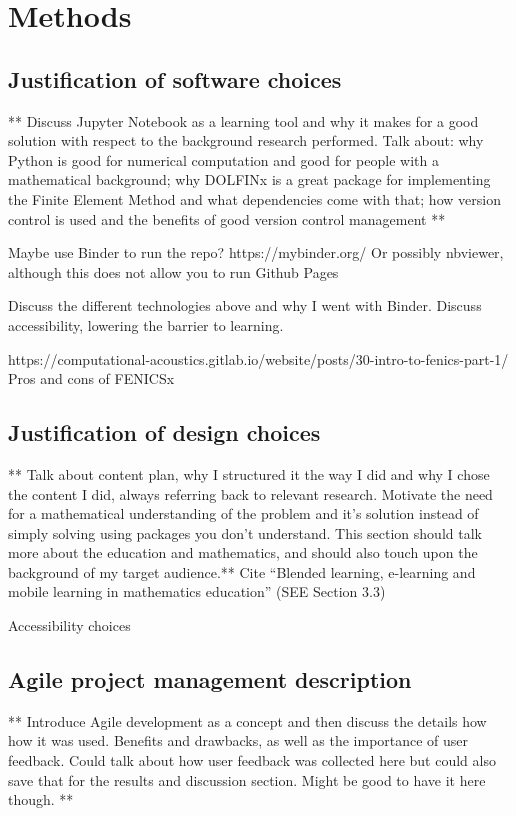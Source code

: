 \chapter{Methods}
\label{chapter2}


\section{Justification of software choices}
** Discuss Jupyter Notebook as a learning tool and why it makes for a good solution with respect to the background research performed. Talk about: why Python is good for numerical computation and good for people with a mathematical background; why DOLFINx is a great package for implementing the Finite Element Method and what dependencies come with that; how version control is used and the benefits of good version control management **

Maybe use Binder to run the repo? https://mybinder.org/
Or possibly nbviewer, although this does not allow you to run
Github Pages

Discuss the different technologies above and why I went with Binder. Discuss accessibility, lowering the barrier to learning.

https://computational-acoustics.gitlab.io/website/posts/30-intro-to-fenics-part-1/ Pros and cons of FENICSx

\section{Justification of design choices}
** Talk about content plan, why I structured it the way I did and why I chose the content I did, always referring back to relevant research. Motivate the need for a mathematical understanding of the problem and it's solution instead of simply solving using packages you don't understand. This section should talk more about the education and mathematics, and should also touch upon the background of my target audience.** Cite ``Blended learning, e-learning and mobile learning in mathematics education'' (SEE Section 3.3)

Accessibility choices

\section{Agile project management description}
** Introduce Agile development as a concept and then discuss the details how how it was used. Benefits and drawbacks, as well as the importance of user feedback. Could talk about how user feedback was collected here but could also save that for the results and discussion section. Might be good to have it here though. **
